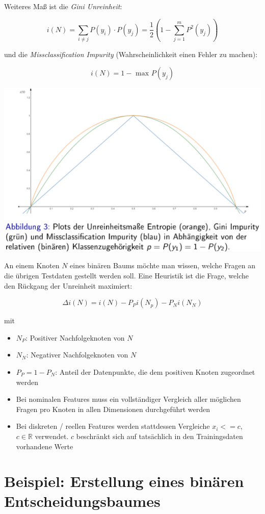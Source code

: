 \documentclass{report}
\begin{document}
Weiteres Maß ist die \textit{Gini Unreinheit}:

$$i(N) = \sum_{i\neq j}P(y_i)\cdot P(y_j) = \frac{1}{2}(1 - \sum_{j=1}^mP^2(y_j))$$

und die \textit{Missclassification Impurity} (Wahrscheinlichkeit einen Fehler zu machen):

$$i(N) = 1 - \text{ max }P(y_j)$$

\begin{center}
  \includegraphics[scale=.3]{ml07_6}
\end{center}

An einem Knoten $N$ eines binären Baums möchte man wissen, welche Fragen an die übrigen Testdaten gestellt werden soll.
Eine Heuristik ist die Frage, welche den Rückgang der Unreinheit maximiert:

$$\Delta i(N) = i(N) - P_Pi(N_p) - P_Ni(N_N)$$

mit\\
\vspace*{-1.5em}
\begin{itemize}
  \item $N_P$: Positiver Nachfolgeknoten von $N$
  \item $N_N$: Negativer Nachfolgeknoten von $N$
  \item $P_P = 1 - P_N$: Anteil der Datenpunkte, die dem positiven Knoten zugeordnet werden
  \item Bei nominalen Features muss ein vollständiger Vergleich aller möglichen Fragen pro Knoten in allen
  Dimensionen durchgeführt werden
  \item Bei diskreten / reellen Features werden stattdessen Vergleiche $x_i <= c$, $c\in \mathbb{R}$ verwendet.
  $c$ beschränkt sich auf tatsächlich in den Trainingsdaten vorhandene Werte
\end{itemize}

\section{Beispiel: Erstellung eines binären Entscheidungsbaumes}
\end{document}
